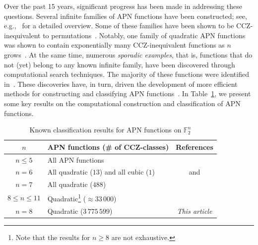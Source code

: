\documentclass{amsart}[11pt]
\theoremstyle{plain}
\theoremstyle{definition}
\numberwithin{theorem}{section}
\numberwithin{equation}{section}
\numberwithin{table}{section}
\numberwithin{figure}{section}
\numberwithin{algorithm}{section}
\begin{document}
Over the past 15 years, significant progress has been made in addressing these questions. Several infinite families of APN functions have been constructed; see, e.g.,~\cite{GologluK2025_CT,Li_Kaleyski_2024} for a detailed overview. Some of these families have been shown to be CCZ-inequivalent to permutations~\cite{GologluL20,GologluPavlu2021}. Notably, one family of quadratic APN functions~\cite{DBLP:journals/dcc/Taniguchi19a} was shown to contain exponentially many CCZ-inequivalent functions as $n$ grows~\cite{KaspersZhou2021}. At the same time, numerous \emph{sporadic examples}, that is, functions that do not (yet) belong to any known infinite family, have been discovered through computational search techniques. The majority of these functions were identified in~\cite{DBLP:journals/corr/abs-2009-07204,DBLP:journals/dcc/BeierleLP22,DBLP:journals/dcc/YuWL14}. These discoveries have, in turn, driven the development of more efficient methods for constructing and classifying APN functions~\cite{DBLP:journals/ccds/Kaleyski21,CanteautCP2022}. In Table~\ref{table:apn_table_plot}, we present some key results on the computational construction and classification of APN functions. 

\begin{table}%
	\centering
	\caption{Known classification results for APN functions on $\mathbb{F}_2^n$}
	\begin{tabular}{c|l|c}
		\hline
		$n$                      & APN functions (\# of CCZ-classes)                                                                 & References                                                                                                                                \\ \hline
		$n \leq 5$               & All APN functions                                                           & \cite{DBLP:journals/dcc/BrinkmannL08}                                                                                    \\ \hline
		$n = 6$                  & All quadratic ($13$) and all cubic ($1$)  & \cite{DBLP:journals/dcc/Pott16} and \cite{langevin}                                                             \\ \hline
		$n = 7$                  & All quadratic ($488$)                             & \cite{DBLP:journals/dcc/YuWL14,DBLP:journals/iacr/KalginI20a}                                                                                     \\ \hline
		\multirow{2}{*}{$8\le n\le 11$} & \multirow{2}{*}{Quadratic\footnote{Note that the results for $n \geq 8$ are not exhaustive.} ($\approx 33\,000$)} & \cite{DBLP:journals/ffa/BeierleCLP22,DBLP:journals/corr/abs-2009-07204,DBLP:journals/dcc/BeierleLP22,EdelP09,IchanskaBKY2025} \\ 
		&                                                                             & \cite{DBLP:journals/dcc/Taniguchi19a,weng2013quadratic,YuPerrin2024,DBLP:journals/dcc/YuWL14}\\ \hline
		$n=8$ & Quadratic ($3\,775\,599$) & \textit{This article} \\ \hline
	\end{tabular}
	\label{table:apn_table_plot}
\end{table}
\end{document}
